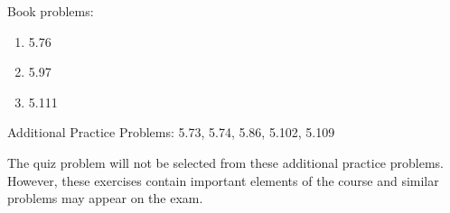 
Book problems:
\begin{enumerate}
  \item 5.76
  \item 5.97
  \item 5.111
\end{enumerate}

Additional Practice Problems: 5.73, 5.74, 5.86, 5.102, 5.109
  
\noindent The quiz problem will not be selected from these additional practice problems.  However, these exercises contain important elements of the course and similar problems may appear on the exam.

\iftoggle{flagSoln}{%
\vspace{.5cm}
\rule{\textwidth}{.4pt}
\vspace{.5cm}
\textbf{Solution:}
\begin{enumerate}
  \item[5.76]  B = 150.0 lb up, C = 5250 lb up
  \item[5.97] $21h/16$ above the vertex of the cone
  \item[5.111] $\bar{X} = 17.00 in$, $\bar{Y} = 15.68 in$, $\bar{Z} = 14.16 in$
\end{enumerate}
}{%
}%
